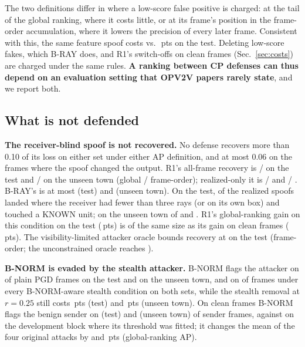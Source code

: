 \documentclass[conference]{IEEEtran}
\newcommand{\pts}{\,pts}
\begin{document}
The two definitions differ in where a low-score false positive is charged: at the tail of the global ranking,
where it costs little, or at its frame's position in the frame-order accumulation, where it lowers the precision
of every later frame. Consistent with this, the same feature spoof costs \LossFrameSpoofFeat{} vs.\
\LossGlobSpoofFeat\pts{} on the test. Deleting low-score fakes, which B-RAY does, and R1's switch-offs on clean
frames (Sec.~\ref{sec:costs}) are charged under the same rules. \textbf{A ranking between CP defenses can thus
depend on an evaluation setting that OPV2V papers rarely state}, and we report both.

\subsection{What is not defended}
\label{sec:limits}
\textbf{The receiver-blind spoof is not recovered.} No defense recovers more than 0.10 of its loss on either set
under either AP definition, and at most 0.06 on the frames where the spoof changed the output. R1's all-frame
recovery is \RecGlobSpoofBlindRONE{} / \RecFrameSpoofBlindRONE{} on the test and \CulRecGlobSpoofBlindRONE{} /
\CulRecFrameSpoofBlindRONE{} on the unseen town (global / frame-order); realized-only it is
\RealRecGlobSpoofBlindRONE{} / \RealRecFrameSpoofBlindRONE{} and \CulRealRecGlobSpoofBlindRONE{} /
\CulRealRecFrameSpoofBlindRONE. B-RAY's is at most \RecFrameSpoofBlindBRAY{} (test) and
\CulRecFrameSpoofBlindBRAY{} (unseen town). On the test, \BlindRealizedLowRay{} of the \RealizedSpoofBlind{}
realized spoofs landed where the receiver had fewer than three rays (or on its own box) and
\BlindRealizedKnownHit{} touched a KNOWN unit; on the unseen town \CulBlindRealizedLowRay{} of
\CulRealizedSpoofBlind{} and \CulBlindRealizedKnownHit. R1's global-ranking gain on this condition on the test
(\dGlobSpoofBlindRONE\pts) is of the same size as its gain on clean frames (\dGlobCleanRONE\pts). The
visibility-limited attacker oracle bounds recovery at \VisOracleRecSpoofBlind{} on the test (frame-order; the
unconstrained oracle reaches \OracleRecSpoofBlind).

\textbf{B-NORM is evaded by the stealth attacker.} B-NORM flags the attacker on \CatchPgdUnt{} of plain PGD frames
on the test and \CulCatchPgdUnt{} on the unseen town, and on \CatchPgdUntSt{} of frames under every
B-NORM-aware stealth condition on both sets, while the stealth removal at $r=0.25$ still costs
\LossGlobPgdRemSt\pts{} (test) and \CulLossGlobPgdRemSt\pts{} (unseen town). On clean frames B-NORM flags the
benign sender on \CatchClean{} (test) and \CulCatchClean{} (unseen town) of sender frames, against
\BnormFalseFlagH{} on the development block where its threshold was fitted; it changes the mean of the four
original attacks by \HeadGlobBNORM{} and \CulHeadGlobBNORM\pts{} (global-ranking AP).
\end{document}
